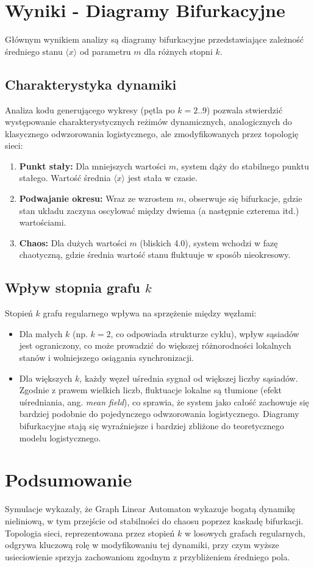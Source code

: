 \documentclass{article}
\begin{document}
\section{Wyniki - Diagramy Bifurkacyjne}
Głównym wynikiem analizy są diagramy bifurkacyjne przedstawiające zależność średniego stanu $\langle x \rangle$ od parametru $m$ dla różnych stopni $k$.

\subsection{Charakterystyka dynamiki}
Analiza kodu generującego wykresy (pętla po $k=2..9$) pozwala stwierdzić występowanie charakterystycznych reżimów dynamicznych, analogicznych do klasycznego odwzorowania logistycznego, ale zmodyfikowanych przez topologię sieci:
\begin{enumerate}
    \item \textbf{Punkt stały:} Dla mniejszych wartości $m$, system dąży do stabilnego punktu stałego. Wartość średnia $\langle x \rangle$ jest stała w czasie.
    \item \textbf{Podwajanie okresu:} Wraz ze wzrostem $m$, obserwuje się bifurkacje, gdzie stan układu zaczyna oscylować między dwiema (a następnie czterema itd.) wartościami.
    \item \textbf{Chaos:} Dla dużych wartości $m$ (bliskich 4.0), system wchodzi w fazę chaotyczną, gdzie średnia wartość stanu fluktuuje w sposób nieokresowy.
\end{enumerate}

\subsection{Wpływ stopnia grafu $k$}
Stopień $k$ grafu regularnego wpływa na sprzężenie między węzłami:
\begin{itemize}
    \item Dla małych $k$ (np. $k=2$, co odpowiada strukturze cyklu), wpływ sąsiadów jest ograniczony, co może prowadzić do większej różnorodności lokalnych stanów i wolniejszego osiągania synchronizacji.
    \item Dla większych $k$, każdy węzeł uśrednia sygnał od większej liczby sąsiadów. Zgodnie z prawem wielkich liczb, fluktuacje lokalne są tłumione (efekt uśredniania, ang. \textit{mean field}), co sprawia, że system jako całość zachowuje się bardziej podobnie do pojedynczego odwzorowania logistycznego. Diagramy bifurkacyjne stają się wyraźniejsze i bardziej zbliżone do teoretycznego modelu logistycznego.
\end{itemize}

\section{Podsumowanie}
Symulacje wykazały, że Graph Linear Automaton wykazuje bogatą dynamikę nieliniową, w tym przejście od stabilności do chaosu poprzez kaskadę bifurkacji. Topologia sieci, reprezentowana przez stopień $k$ w losowych grafach regularnych, odgrywa kluczową rolę w modyfikowaniu tej dynamiki, przy czym wyższe usieciowienie sprzyja zachowaniom zgodnym z przybliżeniem średniego pola.
\end{document}
